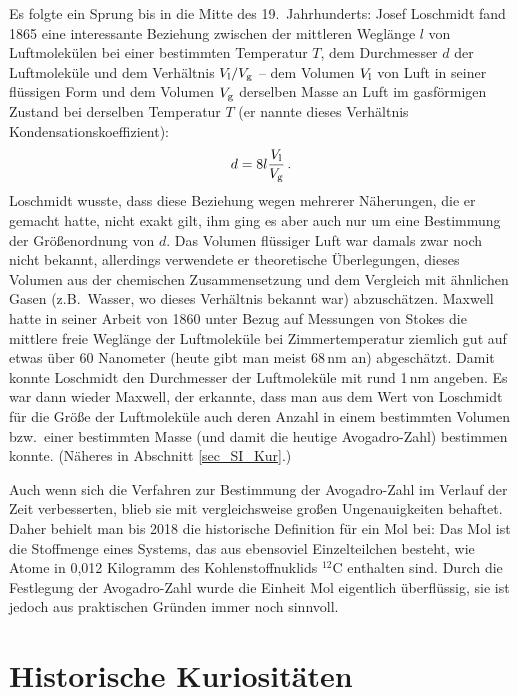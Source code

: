 Es folgte ein Sprung bis in die Mitte des 19.\ Jahrhunderts:
Josef Loschmidt 
fand 1865 eine interessante Beziehung zwischen der mittleren Wegl\"ange $l$ von
Luftmolek\"ulen bei einer bestimmten Temperatur $T$, dem
Durchmesser $d$ der Luftmolek\"ule und dem Verh\"altnis $V_{\rm l}/V_{\rm g}$ -- dem Volumen $V_{\rm l}$
von Luft in seiner fl\"ussigen Form und dem Volumen $V_{\rm g}$ derselben Masse an Luft im gasf\"ormigen
Zustand bei derselben Temperatur $T$ (er nannte dieses Verh\"altnis Kondensationskoeffizient):
\begin{equation}
               d = 8 l \frac{V_{\rm l}}{V_{\rm g}} \, .
\end{equation} 
Loschmidt wusste, dass diese Beziehung wegen mehrerer N\"aherungen, die er gemacht hatte, nicht 
exakt gilt, ihm ging es aber auch nur um eine Bestimmung der
Gr\"o\ss enordnung von $d$. Das Volumen fl\"ussiger Luft war damals zwar noch nicht bekannt,
allerdings verwendete er theoretische \"Uberlegungen, dieses Volumen aus der chemischen Zusammensetzung
und dem Vergleich mit \"ahnlichen Gasen (z.B.\ Wasser, wo dieses Verh\"altnis bekannt war) abzusch\"atzen. 
Maxwell hatte in seiner Arbeit von 1860 unter Bezug auf Messungen von Stokes die mittlere freie Wegl\"ange 
der Luftmolek\"ule bei Zimmertemperatur ziemlich gut auf etwas \"uber 60 Nanometer (heute gibt man meist 68\,nm an) 
abgesch\"atzt. Damit konnte Loschmidt den Durchmesser der Luftmolek\"ule mit rund 1\,nm angeben.
Es war dann wieder Maxwell, der erkannte, 
dass man aus dem Wert von Loschmidt f\"ur die Gr\"o\ss e der Luftmolek\"ule auch deren Anzahl in einem 
bestimmten Volumen bzw.\ einer bestimmten Masse (und damit die heutige Avogadro-Zahl) bestimmen konnte. 
(N\"aheres in Abschnitt \ref{sec_SI_Kur}.)

Auch wenn sich die Verfahren zur Bestimmung der Avogadro-Zahl im Verlauf der Zeit
verbesserten, blieb sie mit vergleichsweise gro\ss en Ungenauigkeiten behaftet. Daher
behielt man bis 2018 die historische Definition f\"ur ein Mol bei: Das Mol ist die Stoffmenge eines Systems, das aus
ebensoviel Einzelteilchen besteht, wie Atome in 0,012 Kilogramm des Kohlenstoffnuklids ${}^{12}$C enthalten
sind. Durch die Festlegung der Avogadro-Zahl wurde die Einheit Mol eigentlich \"uberfl\"ussig, sie ist jedoch
aus praktischen Gr\"unden immer noch sinnvoll.

\section{Historische Kuriosit\"aten}


